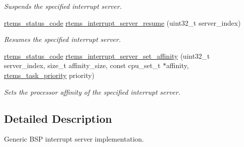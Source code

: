 \begin{DoxyCompactItemize}
\begin{DoxyCompactList}\small\item\em Suspends the specified interrupt server. \end{DoxyCompactList}\item 
\mbox{\hyperlink{group__ClassicStatus_ga545d41846817eaba6143d52ee4d9e9fe}{rtems\+\_\+status\+\_\+code}} \mbox{\hyperlink{group__rtems__interrupt__extension_ga69c0c38dd1999db80b4104a327caba46}{rtems\+\_\+interrupt\+\_\+server\+\_\+resume}} (uint32\+\_\+t server\+\_\+index)
\begin{DoxyCompactList}\small\item\em Resumes the specified interrupt server. \end{DoxyCompactList}\item 
\mbox{\hyperlink{group__ClassicStatus_ga545d41846817eaba6143d52ee4d9e9fe}{rtems\+\_\+status\+\_\+code}} \mbox{\hyperlink{group__rtems__interrupt__extension_ga759f271ddd8a58e83b79058702634c57}{rtems\+\_\+interrupt\+\_\+server\+\_\+set\+\_\+affinity}} (uint32\+\_\+t server\+\_\+index, size\+\_\+t affinity\+\_\+size, const cpu\+\_\+set\+\_\+t $\ast$affinity, \mbox{\hyperlink{group__ClassicTasks_gaa80a0c0938307d1e99d0eb5fee765b47}{rtems\+\_\+task\+\_\+priority}} priority)
\begin{DoxyCompactList}\small\item\em Sets the processor affinity of the specified interrupt server. \end{DoxyCompactList}\end{DoxyCompactItemize}


\subsection{Detailed Description}
Generic B\+SP interrupt server implementation. 

